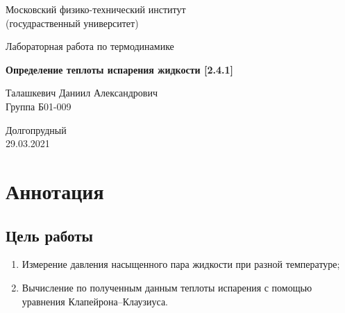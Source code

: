 \documentclass[a4paper,11.5pt]{article} %
\begin{document}


\begin{titlepage}

	\newpage
	\begin{center}
		\normalsize Московский физико-технический институт \\(госудраственный 			университет)
	\end{center}

	\vspace{6em}

	\begin{center}
		\Large Лабораторная работа по термодинамике\\
	\end{center}

	\vspace{1em}

	\begin{center}
		\large \textbf{Определение теплоты испарения жидкости [2.4.1]}
	\end{center}

	\vspace{2em}

	\begin{center}
		\large Талашкевич Даниил Александрович\\
		Группа Б01-009
	\end{center}

	\vspace{\fill}

	\begin{center}
	Долгопрудный \\29.03.2021
	\end{center}
	
\end{titlepage}



	\thispagestyle{empty}
	\newpage
	\tableofcontents
	\newpage
	\setcounter{page}{1}



\section{Аннотация}

\subsection{Цель работы}
\begin{enumerate}
\item Измерение давления насыщенного пара жидкости при разной температуре;
\item Вычисление по полученным данным теплоты испарения с помощью уравнения Клапейрона–Клаузиуса.
\end{enumerate}
\end{document}
